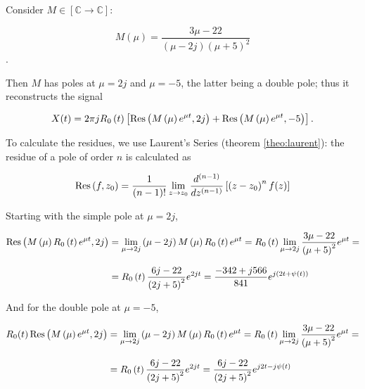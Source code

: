 \begin{example}\label{example:muT_reconst} %

	Consider $M\in\left[\mathbb{C}\to\mathbb{C}\right]$:

\begin{equation} M\left(\mu\right) = \dfrac{3\mu - 22}{\left(\mu - 2j\right)\left(\mu + 5\right)^2} \end{equation}.

	Then $M$ has poles at $\mu = 2j$ and $\mu = -5$, the latter being a double pole; thus it reconstructs the signal

\begin{equation} X(t) = 2\pi j R_0\left(t\right)\left[ \operatorname{Res}\left(M\left(\mu\right) e^{\mu t},2j\right) + \operatorname{Res}\left(M\left(\mu\right) e^{\mu t},-5\right)\right] .\end{equation}

	To calculate the residues, we use Laurent's Series (theorem \ref{theo:laurent}): the residue of a pole of order $n$ is calculated as

\begin{equation} \operatorname{Res}\left(f,z_0\right) = \dfrac{1}{\left(n-1\right)!} \lim_{z\to z_0} \dfrac{d^{(n-1)}}{dz^{(n-1)}} \left[\left(z - z_0\right)^n f(z)\right] \end{equation}

	Starting with the simple pole at $\mu = 2j$,

\begin{align}
	\operatorname{Res}\left(M\left(\mu\right) R_0\left(t\right)e^{\mu t},2j\right) &= \lim_{\mu\to 2j}\left(\mu-2j\right)M\left(\mu\right) R_0\left(t\right)e^{\mu t} = R_0\left(t\right) \lim_{\mu\to 2j} \dfrac{3\mu - 22}{\left(\mu + 5\right)^2} e^{\mu t} = \nonumber\\[3mm] &= R_0\left(t\right) \dfrac{6j - 22}{\left(2j + 5\right)^2} e^{2jt} =  \dfrac{-342 + j566}{841} e^{j\left(2t + \psi(t)\right)}
\end{align}

	And for the double pole at $\mu = -5$,

\begin{align}
	R_0(t) \operatorname{Res}\left(M\left(\mu\right)e^{\mu t},2j\right) &= \lim_{\mu\to 2j}\left(\mu-2j\right)M\left(\mu\right) R_0\left(t\right)e^{\mu t} = R_0\left(t\right) \lim_{\mu\to 2j} \dfrac{3\mu - 22}{\left(\mu + 5\right)^2} e^{\mu t} = \nonumber\\[3mm] &= R_0\left(t\right) \dfrac{6j - 22}{\left(2j + 5\right)^2} e^{2jt} = \dfrac{6j - 22}{\left(2j + 5\right)^2} e^{j2t - j\psi(t)}
\end{align}


\end{example}
